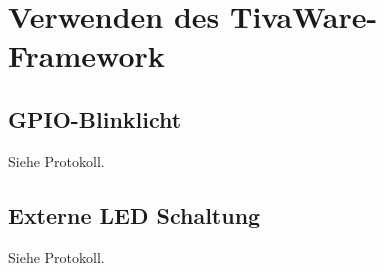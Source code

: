 \section{Verwenden des TivaWare-Framework}
\subsection{GPIO-Blinklicht}
Siehe Protokoll.
\subsection{Externe LED Schaltung}
Siehe Protokoll.